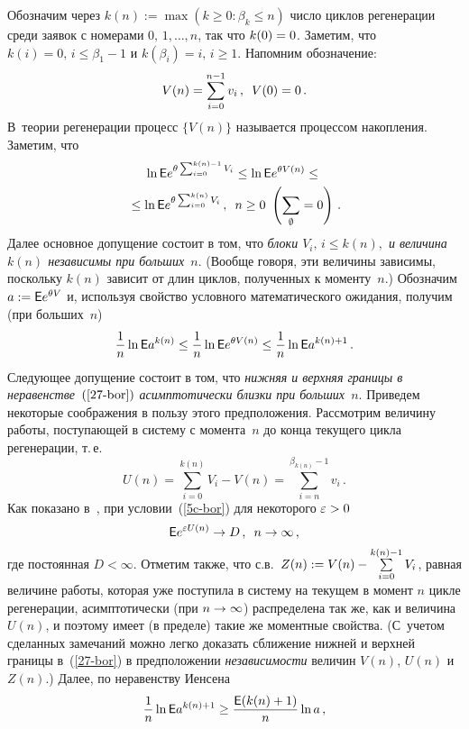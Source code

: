 \begin{multicols}{2}
 Обозначим через $ k(n):=\max(k\ge0: \beta_k \le n)$ число циклов
регенерации  среди
заявок с номерами $0,\,1,\ldots,n$, так что $k(0)\hm=0$.  Заметим, что
$k(i)=0,\,i\le \beta_1-1$ и $k(\beta_i)=i,\,i\ge 1$. Напомним
обозначение: 
$$
V(n)\hm=\sum\limits_{i=0}^{n-1}v_i\,,\enskip V(0)=0\,.
$$
 В~теории
регенерации процесс $\{V(n)\}$ называется процессом накопления.
Заметим, что
\begin{multline*}
\ln \e e^{\theta \sum_{i=0}^{k(n)-1}V_i}\le \ln \e e ^{\theta
V(n)}\le {}\\
{}\le\ln \e e^{\theta \sum_{i=0}^{k(n)} V_i}\,,\enskip n\ge 0
\ \left(\sum\limits_\emptyset=0\right)\,. %
\end{multline*}
Далее основное допущение состоит в   том, что {\it блоки
$V_i,\,i\le k(n),$ и величина $k(n)$ независимы при больших~$n$}.
(Вообще говоря, эти величины зависимы, поскольку  $k(n)$ зависит от
длин циклов, полученных к моменту~$n$.)
Обозначим $a:= {\sf E} e^{\theta V}$ и, используя свойство условного
математического ожидания, получим (при больших~$n$)
\begin{equation}
\displaystyle\frac{\displaystyle 1\mathstrut}{\displaystyle n\mathstrut} \ln {\sf E} a ^{k(n)} \le \displaystyle\frac{\displaystyle 1\mathstrut}{\displaystyle n\mathstrut} \ln {\sf E} e ^{\theta
V(n)}\le \displaystyle\frac{\displaystyle 1\mathstrut}{\displaystyle n\mathstrut} \ln {\sf E} a ^{k(n)+1}\,.
  \label{27-bor}
\end{equation}
Следующее допущение состоит в том, что {\it нижняя и верхняя границы
в неравенстве~$(\ref{27-bor})$ асимптотически близки при больших~$n$}.
Приведем некоторые соображения в пользу   этого предположения.
Рассмотрим величину работы, поступающей в систему с момента~$n$ до
конца текущего  цикла регенерации, т.\,е.\
\begin{equation*}
U(n)=\sum\limits_{i=0}^{k(n)} V_i -V(n) =\sum\limits_{i=n}^{\beta_{k(n)}-1}v_i\,.
\end{equation*}
Как показано в~\cite{Asmus}, при условии~(\ref{5c-bor}) для некоторого
$\varepsilon\hm>0$
$$
{\sf E} e^{\varepsilon U(n)}\to D\,,\enskip n\to \infty\,,
$$
где постоянная  $D<\infty$. Отметим также, что с.в.\
$Z(n):=V(n)\hm-\sum\limits_{i=0}^{k(n)-1} V_i$, равная величине  работы,
которая уже поступила в систему на текущем в момент $n$ цикле
регенерации, асимптотически (при $n\hm\to \infty$) распределена так же,
как и величина $U(n)$, и поэтому имеет (в пределе) такие же
моментные свойства. (С~учетом  сделанных  замечаний можно легко
доказать сближение нижней и верхней границы в~(\ref{27-bor})  в
предположении {\it независимости} величин $V(n)$, $U(n)$ и~$Z(n)$.)
Далее,  по неравенству Иенсена
\begin{equation*}
\fr{1}{n} \ln \e a ^{k(n)+1}\ge \fr{\e(k(n)+1)}{n}\ln a\,,

\end{equation*}
\end{multicols}
